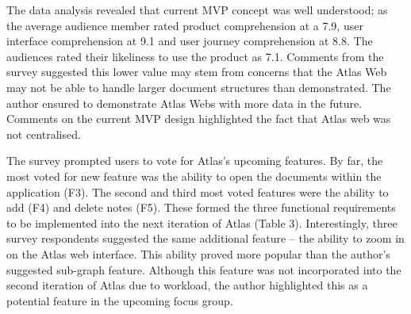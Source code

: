 \documentclass{article}
\begin{document}
The data analysis revealed that current MVP concept was well understood; as the average audience member rated product comprehension at a 7.9, user interface comprehension at  9.1 and user journey comprehension at 8.8. The audiences rated their likeliness to use the product as 7.1. Comments from the survey suggested this lower value may stem from concerns that the Atlas Web may not be able to handle larger document structures than demonstrated. The author ensured to demonstrate Atlas Webs with more data in the future. Comments on the current MVP design highlighted the fact that Atlas web was not centralised.

The survey prompted users to vote for Atlas’s upcoming features. By far, the most voted for new feature was the ability to open the documents within the application (F3). The second and third most voted features were the ability to add (F4) and delete notes (F5). These formed the three functional requirements to be implemented into the next iteration of Atlas (Table 3). Interestingly, three survey respondents suggested the same additional feature – the ability to zoom in on the Atlas web interface. This ability proved more popular than the author’s suggested sub-graph feature. Although this feature was not incorporated into the second iteration of Atlas due to workload, the author highlighted this as a potential feature in the upcoming focus group.

\begin{table}[]
\centering
\caption{The functional requirements and use cases that defined the second iteration of Atlas.}
\label{tab:my-table}
\end{table}
\end{document}
